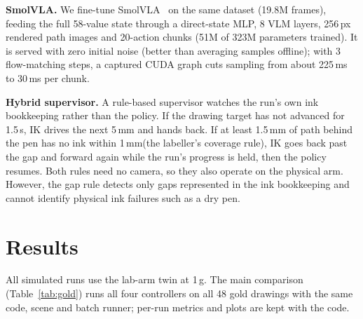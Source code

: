 \documentclass[conference]{IEEEtran}
\newcommand{\mm}{\,mm\xspace}
\begin{document}
\textbf{SmolVLA.} We fine-tune SmolVLA~\cite{shukor2025smolvla} on the same dataset (19.8M frames), feeding the
full 58-value state through a direct-state MLP, 8 VLM layers, 256\,px rendered path images and 20-action chunks
(51M of 323M parameters trained). It is served with zero initial noise (better than averaging samples
offline); with 3 flow-matching steps, a captured CUDA graph cuts sampling from about 225\,ms to 30\,ms per
chunk.

\textbf{Hybrid supervisor.} A rule-based supervisor watches
the run's own ink bookkeeping rather than the policy. If the drawing target has not advanced for 1.5\,s, IK drives
the next 5\mm and hands back. If at least 1.5\mm of path behind the pen has no ink within 1\mm (the labeller's
coverage rule), IK goes back past the gap and forward again while the run's progress is held, then the policy
resumes. Both rules need no camera, so they also operate on the physical arm. However, the gap rule detects only gaps
represented in the ink bookkeeping and cannot identify physical ink failures such as a dry pen.

\section{Results}
\label{sec:results}

All simulated runs use the lab-arm twin at 1\,g. The main comparison (Table~\ref{tab:gold})
runs all four controllers on all 48 gold drawings with the same code, scene and batch runner; per-run metrics and
plots are kept with the code.
\end{document}

